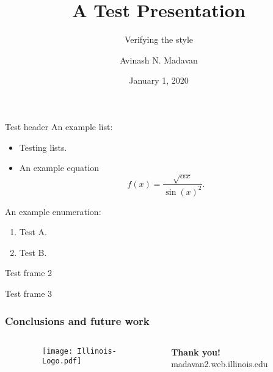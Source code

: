 \documentclass{beamer}
\title{A Test Presentation}
\subtitle{Verifying the style}
\author[A. N. Madavan]{Avinash N. Madavan}
\institute[UIUC]{Univeristy of Illinois, Urbana-Champaign}
\date{January 1, 2020}
\begin{document}
\frame{\titlepage}

\begin{frame}{Test header}
  An example list:
  \begin{itemize}
    \item Testing lists.
    \item An example equation
    \begin{equation*}
      f(x) = \frac{\sqrt{\alpha x}}{\sin(x)^2}.
    \end{equation*}
  \end{itemize}

  An example enumeration:
  \begin{enumerate}
    \item Test A.
    \item Test B.
  \end{enumerate}
\end{frame}

\begin{frame}{Test frame 2}
  
\end{frame}

\begin{frame}{Test frame 3}
  
\end{frame}

\begin{frame}
  \frametitle{Conclusions and future work}

  \begin{columns}[c]
    \begin{column}{0.1\linewidth}\end{column}
    \begin{column}{0.1\linewidth}
      \begin{figure}[H]
        \texttt{[image: Illinois-Logo.pdf]}
      \end{figure}
    \end{column}
    \begin{column}{0.55\linewidth}
      \vspace{1em}

      {\Huge \bf Thank you!}
      {\Large madavan2.web.illinois.edu}
    \end{column}
    \begin{column}{0.1\linewidth}\end{column}
  \end{columns}
\end{frame}
\end{document}

